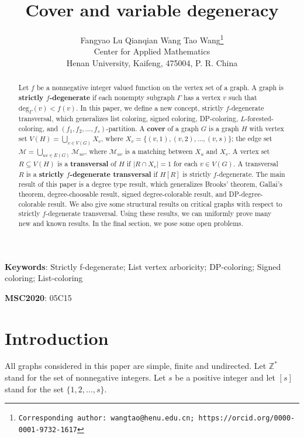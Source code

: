 \documentclass{article}
\theoremstyle{definition}
\begin{document}
\title{Cover and variable degeneracy}
\author{Fangyao Lu { }\quad Qianqian Wang { }\quad Tao Wang\footnote{\tt Corresponding
author: wangtao@henu.edu.cn; https://orcid.org/0000-0001-9732-1617}\\
{\small Center for Applied Mathematics}\\
{\small Henan University, Kaifeng, 475004, P. R. China}}
\date{}
\maketitle
\begin{abstract}
Let $f$ be a nonnegative integer valued function on the vertex set of a graph. A graph is \textbf{strictly $f$-degenerate} if each nonempty subgraph $\Gamma$ has a vertex $v$ such that $\mathrm{deg}_{\Gamma}(v) < f(v)$. In this paper, we define a new concept, strictly $f$-degenerate transversal, which generalizes list coloring, signed coloring, DP-coloring, $L$-forested-coloring, and $(f_{1}, f_{2}, \dots, f_{s})$-partition. A \textbf{cover} of a graph $G$ is a graph $H$ with vertex set $V(H) = \bigcup_{v \in V(G)} X_{v}$, where $X_{v} = \{(v, 1), (v, 2), \dots, (v, s)\}$; the edge set $\mathscr{M} = \bigcup_{uv \in E(G)}\mathscr{M}_{uv}$, where $\mathscr{M}_{uv}$ is a matching between $X_{u}$ and $X_{v}$. A vertex set $R \subseteq V(H)$ is a \textbf{transversal} of $H$ if $|R \cap X_{v}| = 1$ for each $v \in V(G)$. A transversal $R$ is a \textbf{strictly $f$-degenerate transversal} if $H[R]$ is strictly $f$-degenerate. The main result of this paper is a degree type result, which generalizes Brooks' theorem, Gallai's theorem, degree-choosable result, signed degree-colorable result, and DP-degree-colorable result. We also give some structural results on critical graphs with respect to strictly $f$-degenerate transversal. Using these results, we can uniformly prove many new and known results. In the final section, we pose some open problems. 
\end{abstract}

{\bf Keywords}: Strictly f-degenerate; List vertex arboricity; DP-coloring; Signed coloring; List-coloring

{\bf MSC2020}: 05C15

\section{Introduction}\label{sec1}
All graphs considered in this paper are simple, finite and undirected. Let $\mathbb{Z}^{*}$ stand for the set of nonnegative integers. Let $s$ be a positive integer and let $[s]$ stand for the set $\{1, 2, \dots, s\}$. 
\end{document}
